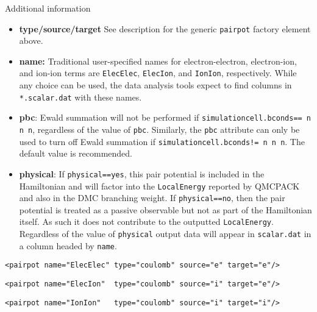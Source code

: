 Additional information
\begin{itemize}
  \item{\textbf{type/source/target} See description for the generic \texttt{pairpot} factory element above.}
  \item{\textbf{name:} Traditional user-specified names for electron-electron, electron-ion, and ion-ion terms are \texttt{ElecElec}, \texttt{ElecIon}, and \texttt{IonIon}, respectively.  While any choice can be used, the data analysis tools expect to find columns in \texttt{*.scalar.dat} with these names.}
  \item{\textbf{pbc}: Ewald summation will not be performed if \texttt{simulationcell.bconds== n n n}, regardless of the value of \texttt{pbc}.  Similarly, the \texttt{pbc} attribute can only be used to turn off Ewald summation if \texttt{simulationcell.bconds!= n n n}.  The default value is recommended.}
  \item{\textbf{physical}: If \texttt{physical==yes}, this pair potential is included in the Hamiltonian and will factor into the \texttt{LocalEnergy} reported by QMCPACK and also in the DMC branching weight.  If \texttt{physical==no}, then the pair potential is treated as a passive observable but not as part of the Hamiltonian itself.  As such it does not contribute to the outputted \texttt{LocalEnergy}.  Regardless of the value of \texttt{physical} output data will appear in \texttt{scalar.dat} in a column headed by \texttt{name}.}
\end{itemize}


\begin{lstlisting}[caption=XML element for Coulomb interaction between electrons.]
  <pairpot name="ElecElec" type="coulomb" source="e" target="e"/>
\end{lstlisting}

\begin{lstlisting}[caption=XML element for Coulomb interaction between electrons and ions (all-electron only).]
  <pairpot name="ElecIon"  type="coulomb" source="i" target="e"/>
\end{lstlisting}

\begin{lstlisting}[caption=XML element for Coulomb interaction between ions.]
  <pairpot name="IonIon"   type="coulomb" source="i" target="i"/>
\end{lstlisting}


